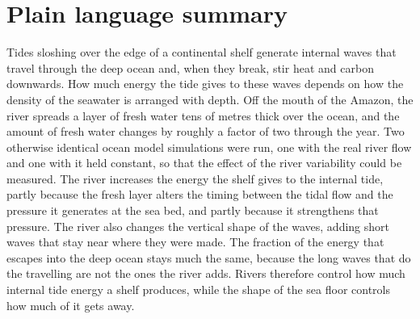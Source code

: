 \documentclass[a4paper,fleqn]{cas-sc}
\begin{document}
\begin{abstract}
This study examines how continental discharge controls the generation of the semidiurnal internal tide of the Amazon margin, using twin simulations that share bathymetry, tidal forcing and period mean freshwater input and differ only in the variability of the river. The barotropic tide is common to the two to within 2\,\% of its amplitude, so the barotropic vertical velocity cancels between them and the conversion anomaly factorises exactly into the amplitude of the baroclinic pressure at the bed and its alignment with the forcing. River buoyancy raises the conversion of the shelf by a fifth to a half through the flood, and the alignment carries the larger part of that gain, because the plume alters the near bottom stratification enough to move the criticality of the break. Where the flood drives the criticality towards unity the two terms fall together and the upper slope converts least at the discharge peak. The same factorisation applied mode by mode shows the plume moving the shelf generation from the gravest mode towards the second, third and fourth, and attributes that shift to the amplitude of the modal pressure, the structure function at the bed contributing little below the fourth mode. The share of the generated energy crossing the 1000~m isobath is unchanged, the gravest mode carrying almost all of the radiated flux while the modes the river adds are lost near their source. Continental discharge therefore sets the magnitude of the conversion and the modal composition of the generated wave, while the margin geometry sets the fraction that radiates.
\end{abstract}


\section*{Plain language summary}

Tides sloshing over the edge of a continental shelf generate internal waves that travel through the deep ocean and, when they break, stir heat and carbon downwards. How much energy the tide gives to these waves depends on how the density of the seawater is arranged with depth. Off the mouth of the Amazon, the river spreads a layer of fresh water tens of metres thick over the ocean, and the amount of fresh water changes by roughly a factor of two through the year. Two otherwise identical ocean model simulations were run, one with the real river flow and one with it held constant, so that the effect of the river variability could be measured. The river increases the energy the shelf gives to the internal tide, partly because the fresh layer alters the timing between the tidal flow and the pressure it generates at the sea bed, and partly because it strengthens that pressure. The river also changes the vertical shape of the waves, adding short waves that stay near where they were made. The fraction of the energy that escapes into the deep ocean stays much the same, because the long waves that do the travelling are not the ones the river adds. Rivers therefore control how much internal tide energy a shelf produces, while the shape of the sea floor controls how much of it gets away.
\end{document}
